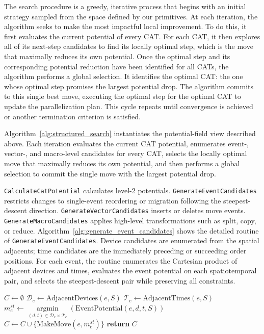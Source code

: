 \documentclass[letterpaper,twocolumn,10pt]{article}
\begin{document}
The search procedure is a greedy, iterative process that begins with an initial strategy sampled from the space defined by our primitives. At each iteration, the algorithm seeks to make the most impactful local improvement. To do this, it first evaluates the current potential of every CAT. For each CAT, it then explores all of its next-step candidates to find its locally optimal step, which is the move that maximally reduces its own potential. Once the optimal step and its corresponding potential reduction have been identified for all CATs, the algorithm performs a global selection. It identifies the optimal CAT: the one whose optimal step promises the largest potential drop. The algorithm commits to this single best move, executing the optimal step for the optimal CAT to update the parallelization plan. This cycle repeats until convergence is achieved or another termination criterion is satisfied.

Algorithm~\ref{alg:structured_search} instantiates the potential-field view described above. Each iteration evaluates the current CAT potential, enumerates event-, vector-, and macro-level candidates for every CAT, selects the locally optimal move that maximally reduces its own potential, and then performs a global selection to commit the single move with the largest potential drop.

\texttt{CalculateCatPotential} calculates level-2 potentials. \texttt{GenerateEventCandidates} restricts changes to single-event reordering or migration following the steepest-descent direction. \texttt{GenerateVectorCandidates} inserts or deletes move events. \texttt{GenerateMacroCandidates} applies high-level transformations such as split, copy, or reduce. Algorithm~\ref{alg:generate_event_candidates} shows the detailed routine of \texttt{GenerateEventCandidates}. Device candidates are enumerated from the spatial adjacents; time candidates are the immediately preceding or succeeding order positions. For each event, the routine enumerates the Cartesian product of adjacent devices and times, evaluates the event potential on each spatiotemporal pair, and selects the steepest-descent pair while preserving all constraints.

\begin{algorithm}[h]
\caption{GenerateEventCandidates$(T, S)$}
\label{alg:generate_event_candidates}
\begin{algorithmic}[1]
\STATE $C \gets \emptyset$
  \STATE $\mathcal{D}_e \gets \text{AdjacentDevices}(e, S)$
  \STATE $\mathcal{T}_e \gets \text{AdjacentTimes}(e, S)$
  \STATE $m^{st}_e \gets \operatorname*{argmin}\limits_{(d,t) \in \mathcal{D}_e \times \mathcal{T}_e}(\text{EventPotential}(e, d, t, S))$
    \STATE $C \gets C \cup \{\text{MakeMove}(e, m^{st}_e)\}$
  \ENDIF
\ENDFOR
\STATE \textbf{return} $C$
\end{algorithmic}
\end{algorithm}
\end{document}
